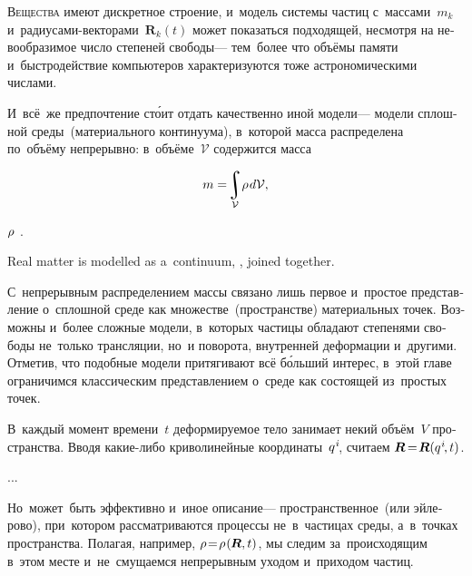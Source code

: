 \begin{otherlanguage}{russian}

\lettrine[lines=2, findent=2pt, nindent=0pt]{В}{ещества} имеют дискретное строение, и~модель системы частиц с~массами~${m_k}$ и~радиусами\hbox{-}векторами~${\bm{R}_k (t)}$ может показаться подходящей, несмотря на невообразимое число степеней свободы\:--- тем~более что объёмы памяти и~быстродействие компьютеров характеризуются тоже астрономическими числами.

И~всё~же предпочтение ст\'{о}ит отдать качественно иной модели\:--- модели сплошной среды~(материального континуума), в~которой масса распределена по~объёму непрерывно: в~объёме~$\mathcal{V}$ содержится масса

\nopagebreak\vspace{-0.5em}\begin{equation}
m =\! \integral\displaylimits_{\mathcal{V}} \! \rho \hspace{0.2ex} d\mathcal{V},
\end{equation}

\vspace{-0.25em}\noindent {} ${\rho\hspace{.1ex}}$\ru{\:---} .

Real matter is modelled as a~continuum,    , joined together.

С~непрерывным распределением массы связано лишь первое и~простое представление о~сплошной среде как множестве~(пространстве) материальных точек. Возможны и~более сложные модели, в~которых частицы обладают степенями свободы не~только трансляции, но~и поворота, внутренней деформации и~другими. Отметив, что подобные модели притягивают всё б\'{о}льший интерес, в~этой главе ограничимся классическим представлением о~среде как состоящей из~простых точек.

В~каждый момент времени~$t$ деформируемое тело занимает некий объём~$V$ пространства. Вводя какие\hbox{-}либо криволинейные координаты~${q^{\hspace{.1ex}i}\hspace{-0.4ex}}$, считаем ${\bm{R} \hspace{-0.25ex} = \hspace{-0.4ex} \bm{R}(q^{\hspace{.1ex}i} \hspace{-0.3ex}, t)}$.

...


Но~может~быть эффективно и~иное описание\:--- пространственное~(или эйлерово), при~котором рассматриваются процессы не~в~частицах среды, а~в~точках пространства. Полагая, например, ${\rho \!=\! \rho \hspace{.16ex} (\hspace{-0.1ex}\bm{R}, t)}$, мы следим за~происходящим в~этом месте и~не~смущаемся непрерывным уходом и~приходом частиц.

\end{otherlanguage}

